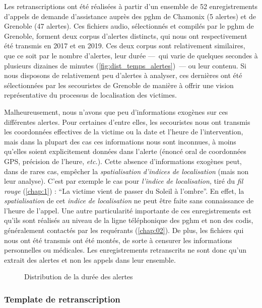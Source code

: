 Les retranscriptions ont été réalisées à partir d'un ensemble de 52
enregistrements d'appels de demande d'assistance auprès des \ac{pghm}
de Chamonix (5 alertes) et de Grenoble (47 alertes). Ces fichiers
audio, sélectionnés et compilés par le \ac{pghm} de Grenoble, forment
deux corpus d'alertes distincts, qui nous ont respectivement été
transmis en 2017 et en 2019. Ces deux corpus sont relativement
similaires, que ce soit par le nombre d'alertes, leur durée ---~qui
varie de quelques secondes à plusieurs dizaines de minutes
(\autoref{fig:dist_temps_alertes})~--- ou leur contenu. Si nous
disposons de relativement peu d'alertes à analyser, ces dernières ont
été sélectionnées par les secouristes de Grenoble de manière à offrir
une vision représentative du processus de localisation des victimes.

Malheureusement, nous n'avons que peu d'informations exogènes sur ces
différentes alertes. Pour certaines d'entre elles, les secouristes
nous ont transmis les coordonnées effectives de la victime ou la date
et l'heure de l'intervention, mais dans la plupart des cas ces
informations nous sont inconnues, à moins qu'elles soient
explicitement données dans l'alerte (\eg énoncé oral de coordonnées
GPS, précision de l'heure, \emph{etc.}). Cette absence d'informations
exogènes peut, dans de rares cas, empêcher la \emph{spatialisation}
\emph{d'indices de localisation} (mais non leur analyse). C'est par
exemple le cas pour \emph{l'indice de localisation,} tiré du \emph{fil
  rouge} (\autoref{chap:1}) : \enquote{La victime vient de passer du
  Soleil à l'ombre}. En effet, la \emph{spatialisation} de cet
\emph{indice de localisation} ne peut être faite sans connaissance de
l'heure de l'appel. Une autre particularité importante de ces
enregistrements est qu'ils sont réalisés au niveau de la ligne
téléphonique des \ac{pghm} et non des \ac{codis}, généralement
contactés par les requérants (\autoref{chap:02}). De plus, les
fichiers qui nous ont été transmis ont été montés, de sorte à censurer
les informations personnelles ou médicales. Les enregistrements
retranscrits ne sont donc qu'un extrait des alertes et non les appels
dans leur ensemble.

\begin{figure}
  \centering
  
  \caption{Distribution de la durée des alertes}
  \label{fig:dist_temps_alertes}
\end{figure}

\subsubsection{Template de retranscription}

